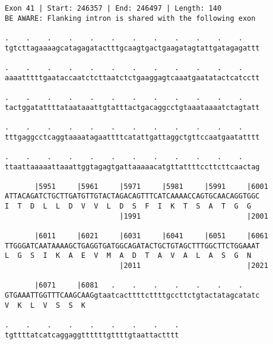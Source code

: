 \documentclass{article}
\begin{document}
\newpage
\begin{Verbatim}[fontfamily=courier]
Exon 41 | Start: 246357 | End: 246497 | Length: 140
BE AWARE: Flanking intron is shared with the following exon

.    .    .    .    .    .    .    .    .    .    .    .    
tgtcttagaaaagcatagagatactttgcaagtgactgaagatagtattgatagagattt

.    .    .    .    .    .    .    .    .    .    .    .    
aaaatttttgaataccaatctcttaatctctgaaggagtcaaatgaatatactcatcctt

.    .    .    .    .    .    .    .    .    .    .    .    
tactggatattttataataaattgtatttactgacaggcctgtaaataaaatctagtatt

.    .    .    .    .    .    .    .    .    .    .    .    
tttgaggcctcaggtaaaatagaattttcatattgattaggctgttccaatgaatatttt

.    .    .    .    .    .    .    .    .    .    .    .    
ttaattaaaaattaaattggtagagtgattaaaaacatgttattttccttcttcaactag

       |5951     |5961     |5971     |5981     |5991     |6001
ATTACAGATCTGCTTGATGTTGTACTAGACAGTTTCATCAAAACCAGTGCAACAGGTGGC
I  T  D  L  L  D  V  V  L  D  S  F  I  K  T  S  A  T  G  G  
                           |1991                         |2001

       |6011     |6021     |6031     |6041     |6051     |6061
TTGGGATCAATAAAAGCTGAGGTGATGGCAGATACTGCTGTAGCTTTGGCTTCTGGAAAT
L  G  S  I  K  A  E  V  M  A  D  T  A  V  A  L  A  S  G  N  
                           |2011                         |2021

       |6071     |6081   .    .    .    .    .    .    .    
GTGAAATTGGTTTCAAGCAAGgtaatcacttttcttttgccttctgtactatagcatatc
V  K  L  V  S  S  K                                         

.    .    .    .    .    .    .    .    .
tgttttatcatcaggaggttttttgttttgtaattactttt
\end{Verbatim}
\newpage
\end{document}
